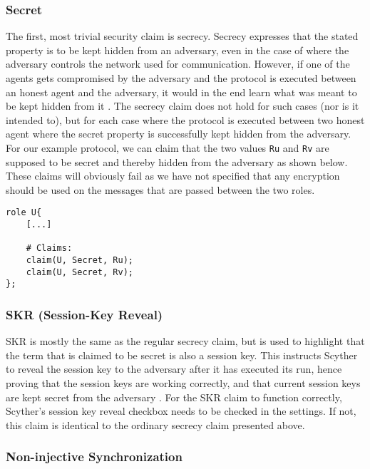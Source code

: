 \subsubsection{Secret}

The first, most trivial security claim is secrecy. Secrecy expresses that the stated property is to be kept hidden from an adversary, even in the case of where the adversary controls the network used for communication. However, if one of the agents gets compromised by the adversary and the protocol is executed between an honest agent and the adversary, it would in the end learn what was meant to be kept hidden from it \cite{cremers2005operational}. The secrecy claim does not hold for such cases (nor is it intended to), but for each case where the protocol is executed between two honest agent where the secret property is successfully kept hidden from the adversary. For our example protocol, we can claim that the two values \texttt{Ru} and \texttt{Rv} are supposed to be secret and thereby hidden from the adversary as shown below. These claims will obviously fail as we have not specified that any encryption should be used on the messages that are passed between the two roles.\newline

\begin{lstlisting}
role U{
	[...]
	
	# Claims:
	claim(U, Secret, Ru);
	claim(U, Secret, Rv);
};
\end{lstlisting}




\subsubsection{SKR (Session-Key Reveal)}

SKR is mostly the same as the regular secrecy claim, but is used to highlight that the term that is claimed to be secret is also a session key. This instructs Scyther to reveal the session key to the adversary after it has executed its run, hence proving that the session keys are working correctly, and that current session keys are kept secret from the adversary \cite{scyther-manual}. For the SKR claim to function correctly, Scyther's session key reveal checkbox needs to be checked in the settings. If not, this claim is identical to the ordinary secrecy claim presented above.


\subsubsection{Non-injective Synchronization}

